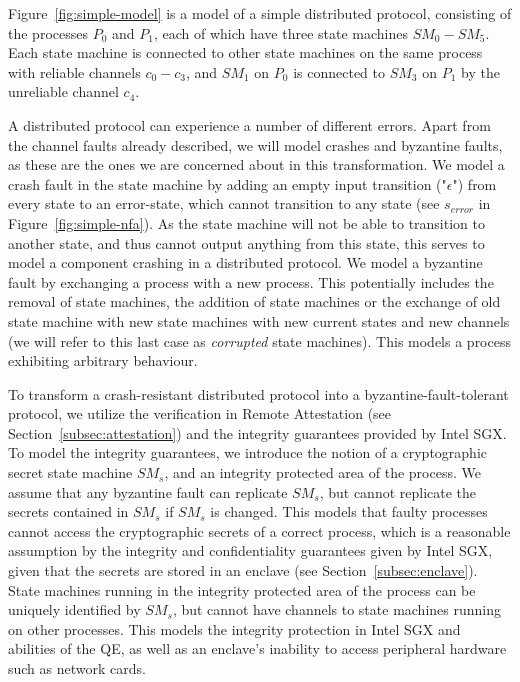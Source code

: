 \documentclass{article}
\begin{document}
	Figure~\ref{fig:simple-model} is a model of a simple distributed protocol, consisting of the processes $P_0$ and $P_1$, each of which have three state machines $SM_0 - SM_5$.
	Each state machine is connected to other state machines on the same process with reliable channels $c_0-c_3$, and $SM_1$ on $P_0$ is connected to $SM_3$ on $P_1$ by the unreliable channel $c_4$.

	A distributed protocol can experience a number of different errors.
	Apart from the channel faults already described, we will model crashes and byzantine faults, as these are the ones we are concerned about in this transformation.
	We model a crash fault in the state machine by adding an empty input transition ("$\epsilon$") from every state to an error-state, which cannot transition to any state (see $s_{error}$ in Figure~\ref{fig:simple-nfa}).
	As the state machine will not be able to transition to another state, and thus cannot output anything from this state, this serves to model a component crashing in a distributed protocol.
	We model a byzantine fault by exchanging a process with a new process.
	This potentially includes the removal of state machines, the addition of state machines or the exchange of old state machine with new state machines with new current states and new channels (we will refer to this last case as \textit{corrupted} state machines).
	This models a process exhibiting arbitrary behaviour.

	To transform a crash-resistant distributed protocol into a byzantine-fault-tolerant protocol, we utilize the verification in Remote Attestation (see Section~\ref{subsec:attestation}) and the integrity guarantees provided by Intel SGX.
	To model the integrity guarantees, we introduce the notion of a cryptographic secret state machine $SM_{s}$, and an integrity protected area of the process.
	We assume that any byzantine fault can replicate $SM_{s}$, but cannot replicate the secrets contained in $SM_s$ if $SM_s$ is changed.
	This models that faulty processes cannot access the cryptographic secrets of a correct process, which is a reasonable assumption by the integrity and confidentiality guarantees given by Intel SGX, given that the secrets are stored in an enclave (see Section~\ref{subsec:enclave}).
	State machines running in the integrity protected area of the process can be uniquely identified by $SM_{s}$, but cannot have channels to state machines running on other processes.
	This models the integrity protection in Intel SGX and abilities of the QE, as well as an enclave's inability to access peripheral hardware such as network cards.
\end{document}
